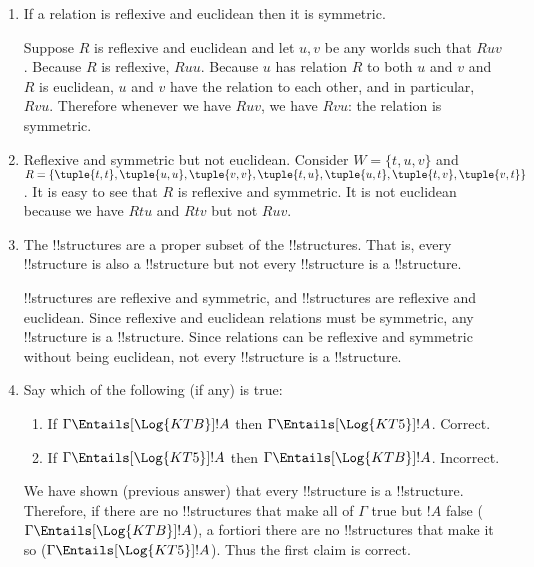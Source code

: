 \documentclass[../../../../include/open-logic-section]{subfiles}
\begin{document}
\begin{prob}
\begin{ans}
\begin{enumerate}
		\item If a relation is reflexive and euclidean then
		it is symmetric.

		Suppose $R$ is reflexive and euclidean and let $u,v$ be any 
		worlds such that $Ruv$. Because $R$ is reflexive, $Ruu$. 
		Because $u$ has relation $R$ 
		to both $u$ and $v$ and $R$ is euclidean, $u$ and $v$ have
		the relation to each other, and in particular, $Rvu$. 
		Therefore whenever we have $Ruv$, we have $Rvu$: the relation
		is symmetric.

		\item Reflexive and symmetric but not euclidean. Consider
		$W=\{t,u,v\}$ and $R=\{\tuple{t,t},\tuple{u,u},\tuple{v,v},
		\tuple{t,u},\tuple{u,t},\tuple{t,v},\tuple{v,t}\}$. It is easy
		to see that $R$ is reflexive and symmetric. It is not
		euclidean because we have $Rtu$ and $Rtv$ but not $Ruv$.

		\item The  !!{structure}s are a proper subset of 
		the  !!{structure}s. That is, every  
		!!{structure} is also a  !!{structure} but not 
		every  !!{structure} is a  
		!!{structure}.
		
		 !!{structure}s are reflexive and symmetric,
		and  !!{structure}s are reflexive and euclidean.
		Since reflexive and euclidean relations must be symmetric, 
		any  !!{structure} is a  !!{structure}. 
		Since relations can be reflexive and symmetric without 
		being euclidean, not every  !!{structure} is a 
		 !!{structure}.

		\item Say which of the following (if any) is true: 
		\begin{enumerate}
			\item If $\Gamma \Entails[\Log{KTB}] !A$ then $\Gamma \Entails[\Log{KT5}] !A$. Correct.
			\item If $\Gamma \Entails[\Log{KT5}] !A$ then $\Gamma \Entails[\Log{KTB}] !A$. Incorrect.
		\end{enumerate}	

		We have shown (previous answer) that every  
		!!{structure} is a  !!{structure}. Therefore, if 
		there are no  !!{structure}s that make all of $\Gamma$ 
		true but $!A$ false ($\Gamma \Entails[\Log{KTB}] !A$), a fortiori 
		there are no  !!{structure}s that make it so
		($\Gamma \Entails[\Log{KT5}] !A$). Thus the first claim is correct.


\end{enumerate}
\end{ans}
\end{prob}
\end{document}
